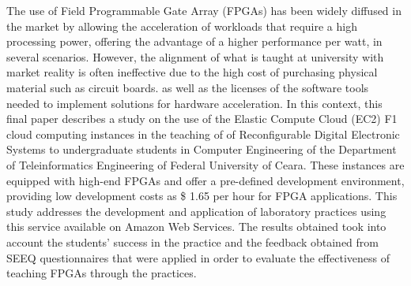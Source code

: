 The use of Field Programmable Gate Array (FPGAs) has been widely diffused in the market by allowing the acceleration of workloads that require a high processing power, offering the advantage of a higher performance per watt, in several scenarios. However, the alignment of what is taught at university with market reality is often ineffective due to the high cost of purchasing physical material such as circuit boards. as well as the licenses of the software tools needed to implement solutions for hardware acceleration. In this context, this final paper describes a study on the use of the Elastic Compute Cloud (EC2) F1 cloud computing instances in the teaching of of Reconfigurable Digital Electronic Systems to undergraduate students in Computer Engineering of the Department of Teleinformatics Engineering of Federal University of Ceara. These instances are equipped with high-end FPGAs and offer a pre-defined development environment, providing low development costs as \$ 1.65 per hour for FPGA applications. This study addresses the development and application of laboratory practices using this service available on Amazon Web Services. The results obtained took into account the students' success in the practice and the feedback obtained from SEEQ questionnaires that were applied in order to evaluate the effectiveness of teaching FPGAs through the practices.

